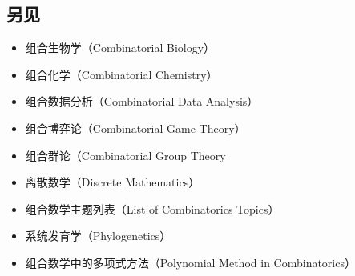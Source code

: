 \subsection{另见}
\begin{itemize}
\item 组合生物学（Combinatorial Biology）  
\item 组合化学（Combinatorial Chemistry） 
\item 组合数据分析（Combinatorial Data Analysis）  
\item 组合博弈论（Combinatorial Game Theory） 
\item 组合群论（Combinatorial Group Theory 
\item 离散数学（Discrete Mathematics）
\item 组合数学主题列表（List of Combinatorics Topics）  
\item 系统发育学（Phylogenetics）  
\item 组合数学中的多项式方法（Polynomial Method in Combinatorics）
\end{itemize}






